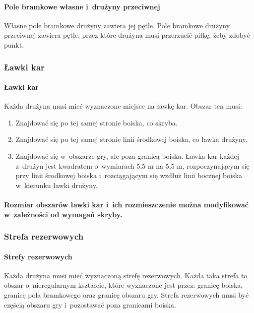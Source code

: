 \documentclass[12pt,a4paper]{article}
\begin{document}
\paragraph{Pole bramkowe własne i~drużyny przeciwnej}
Własne pole bramkowe drużyny zawiera jej pętle. Pole bramkowe drużyny
przeciwnej zawiera pętle, przez które drużyna musi przerzucić piłkę,
żeby zdobyć punkt.

\subsubsection{Ławki kar}

\paragraph{Ławki kar}
Każda drużyna musi mieć wyznaczone miejsce
na ławkę kar. Obszar ten musi:
\begin{enumerate}
	\item Znajdować się po tej samej stronie boiska, co skryba.

	\item Znajdować się po tej samej stronie linii środkowej boiska, co ławka
	      drużyny.

	\item Znajdować się w~obszarze gry, ale poza granicą boiska. Ławka kar każdej z~drużyn jest kwadratem o~wymiarach 5,5 m na 5,5 m, rozpoczynającym się przy linii środkowej boiska i~rozciągającym się wzdłuż linii bocznej boiska w~kierunku ławki drużyny.
\end{enumerate}

\paragraph{Rozmiar obszarów ławki kar i~ich rozmieszczenie można
	modyfikować w~zależności od wymagań skryby.}

\subsubsection{Strefa rezerwowych}

\paragraph{Strefy rezerwowych}
Każda drużyna musi mieć
wyznaczoną strefę rezerwowych. Każda taka strefa to obszar o~nieregularnym kształcie, które wyznaczone jest przez: granicę boiska,
granicę pola bramkowego oraz granicę obszaru gry. Strefa rezerwowych
musi być częścią obszaru gry i~pozostawać poza granicami boiska.
\end{document}
